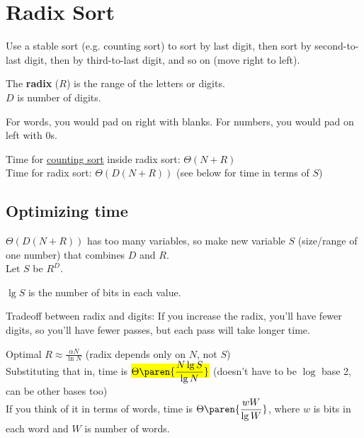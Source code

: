\section{Radix Sort}

Use a stable sort (e.g. counting sort) to sort by last digit, then sort by second-to-last digit, then by third-to-last digit, and so on (move right to left).

The \textbf{radix} ($R$) is the range of the letters or digits.\\
$D$ is number of digits.

For words, you would pad on right with blanks. For numbers, you would pad on left with 0s.

Time for \hyperref[sec:Counting-Sort]{counting sort} inside radix sort: $\Theta(N + R)$\\
Time for radix sort: $\Theta(D(N + R))$ (see below for time in terms of $S$)

\subsection*{Optimizing time}

$\Theta(D(N+R))$ has too many variables, so make new variable $S$ (size/range of one number) that combines $D$ and $R$.\\
Let $S$ be $R^D$.

$\lg S$ is the number of bits in each value.

Tradeoff between radix and digits: If you increase the radix, you'll have fewer digits, so you'll have fewer passes, but each pass will take longer time.

Optimal $R \approx \frac{\alpha N}{\ln N}$ (radix depends only on $N$, not $S$)\\
Substituting that in, time is \colorbox{yellow}{$\displaystyle \Theta\paren{\frac{N\lg S}{\lg N}}$} (doesn't have to be $\log$ base 2, can be other bases too)\\
If you think of it in terms of words, time is $\displaystyle \Theta\paren{\frac{wW}{\lg W}}$, where $w$ is bits in each word and $W$ is number of words.
